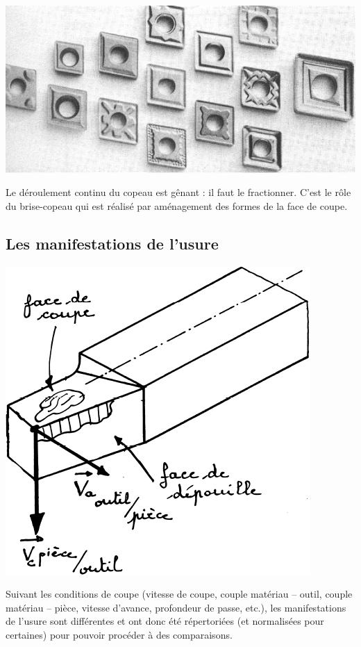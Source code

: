 \documentclass[11pt,oneside]{article}
\begin{document}
\noindent \begin{minipage}[c]{.45\linewidth}
\begin{center}
\includegraphics[width=\textwidth]{png/fig_05}
\end{center}
\end{minipage}\hfill
\begin{minipage}[c]{.45\linewidth}
Le déroulement continu du copeau est gênant : il faut le fractionner. C'est le rôle du brise-copeau qui est réalisé par aménagement des formes de la face de coupe.
\end{minipage}




\subsection{Les manifestations de l'usure}

\noindent \begin{minipage}[c]{.45\linewidth}
\begin{center}
\includegraphics[width=.75\textwidth]{png/fig_06}
\end{center}
\end{minipage}
\begin{minipage}[c]{.45\linewidth}
Suivant les conditions de coupe (vitesse de coupe, couple matériau -- outil, couple matériau -- pièce, vitesse d'avance, profondeur de passe, etc.), les manifestations de l'usure sont différentes et ont donc été répertoriées (et normalisées pour certaines) pour pouvoir procéder à des comparaisons.
\end{minipage}
\end{document}
